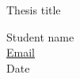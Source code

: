 \clearpage
\thispagestyle{empty}


\vspace*{\fill}
\begin{center}
    \Huge Thesis title \\

    \vspace{2cm}

    \normalsize Student name \\
    \normalsize \href{mailto:address}{Email} \\

    \vspace{1cm}
    \normalsize Date\\
\end{center}

\vspace*{\fill}